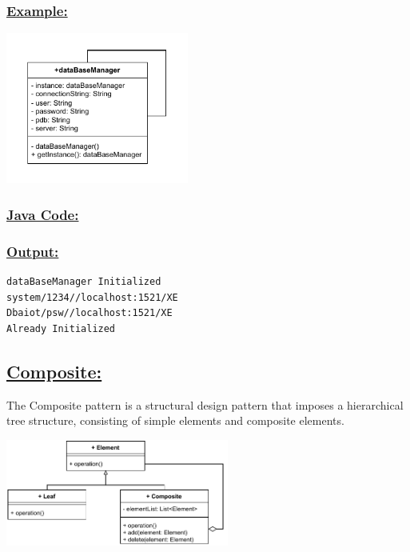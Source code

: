 \subsubsection*{\underline{Example:}}
\begin{center}
\includegraphics[width=0.45\textwidth,height=0.35\textheight]{Chapters/DesignPattern/Singleton/single2.drawio.pdf}
\end{center}


\subsubsection*{\underline{Java Code:}}


\newpage



\newpage
\subsubsection*{\underline{Output:}}
\begin{lstlisting}[style=cmd]
dataBaseManager Initialized
system/1234//localhost:1521/XE
Dbaiot/psw//localhost:1521/XE
Already Initialized
\end{lstlisting}

\vspace{0.5cm}
\subsection*{\underline{Composite:}}
The Composite pattern is a structural design pattern that imposes a
hierarchical tree structure, consisting of simple elements and composite elements.

\begin{center}
\includegraphics[width=0.55\textwidth,height=0.35\textheight]{Chapters/DesignPattern/Composite/comp1.drawio.pdf}
\end{center}


